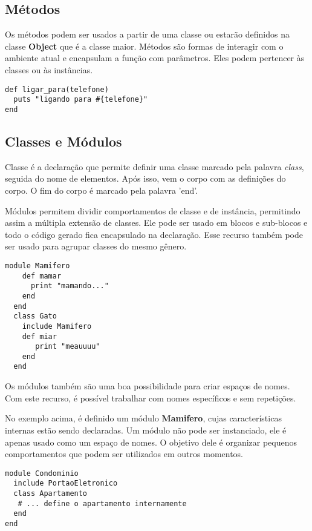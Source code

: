 \documentclass[espaco=simples,appendix=Name]{abnt}
\begin{document}
\subsection { Métodos }

Os métodos podem ser usados a partir de uma classe ou estarão definidos na classe \textbf{Object} que é a classe maior. Métodos são formas de interagir com o ambiente atual e encapsulam a função com parâmetros. Eles podem pertencer às classes ou às instâncias. 

\begin{lstlisting}[caption=Exemplo de método ]
def ligar_para(telefone)
  puts "ligando para #{telefone}"
end
\end{lstlisting}

\subsection { Classes e Módulos }
 
Classe é a declaração que permite definir uma classe marcado pela palavra \textit{class}, seguida do nome de elementos. Após isso, vem o corpo com as definições do corpo. O fim do corpo é marcado pela palavra 'end'.

Módulos permitem dividir comportamentos de classe e de instância, permitindo assim a múltipla extensão de classes. Ele pode ser usado em blocos e sub-blocos e todo o código gerado fica encapsulado na declaração. Esse recurso também pode ser usado para agrupar classes do mesmo gênero. 

\begin{lstlisting}[caption=Exemplo de módulo ]
  module Mamifero
    def mamar
      print "mamando..."
    end
  end
  class Gato
    include Mamifero
    def miar
       print "meauuuu"
    end
  end
\end{lstlisting}

Os módulos também são uma boa possibilidade para criar espaços de nomes. Com este recurso, é possível trabalhar com nomes específicos e sem repetições.

No exemplo acima, é definido um módulo \textbf{Mamifero}, cujas características internas estão sendo declaradas. Um módulo não pode ser instanciado, ele é apenas usado como um espaço de nomes. O objetivo dele é organizar pequenos comportamentos que podem ser utilizados em outros momentos.

\begin{lstlisting}[caption=Exemplo de módulo como espaço ]
module Condominio
  include PortaoEletronico
  class Apartamento
   # ... define o apartamento internamente
  end
end 
\end{lstlisting}
\end{document}
